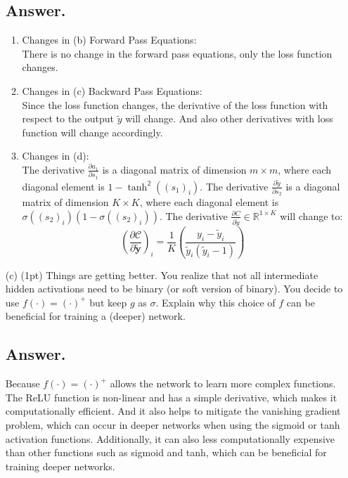 \documentclass{article}
\begin{document}
\begin{itemize}
    \subsection*{Answer.}
    \begin{enumerate}
        \item{Changes in (b) Forward Pass Equations:}\\
        There is no change in the forward pass equations, only the loss function changes.
        \item {Changes in (c) Backward Pass Equations:} \\
         Since the loss function changes, the derivative of the loss function with respect to the output \(\tilde{y}\) will change. 
         And also other derivatives with loss function will change accordingly.       
        \item{Changes in (d):}\\
        The derivative \( \frac{\partial a_1}{\partial s_1} \) is a diagonal matrix of dimension \( m \times m \), where each diagonal element is \( 1-\tanh^2((s_1)_i) \).
        The derivative \( \frac{\partial \tilde{y}}{\partial s_2} \) is a diagonal matrix of dimension \( K \times K \), where each diagonal element is \( \sigma((s_2)_i)(1 - \sigma((s_2)_i)) \).
        The derivative \( \frac{\partial C}{\partial \tilde{y}} \in \mathbb{R}^{1 \times K} \) will change to: 
        \[\left( \frac{\partial \mathcal{C}}{\partial \boldsymbol{\tilde{y}}} \right)_{i} = \frac{1}{K} \left( \frac{y_i - \tilde{y}_i}{\tilde{y}_i (\tilde{y}_i - 1)} \right)
\]

        
    \end{enumerate}



    \item[(c)] (1pt) Things are getting better. You realize that not all intermediate hidden activations need to be binary (or soft version of binary). You decide to use $f(\cdot) = (\cdot)^+ $ but keep $g$ as $\sigma$. Explain why this choice of $f$ can be beneficial for training a (deeper) network.
    \subsection*{Answer.}
    Because \(f(\cdot) = (\cdot)^+\) allows the network to learn more complex functions. 
    The ReLU function is non-linear and has a simple derivative, which makes it computationally efficient. 
    And it also helps to mitigate the vanishing gradient problem, which can occur in deeper networks when using the sigmoid or tanh activation functions. 
    Additionally, it can also less computationally expensive than other functions such as sigmoid and tanh, which can be beneficial for training deeper networks.
\end{itemize}
\end{document}
